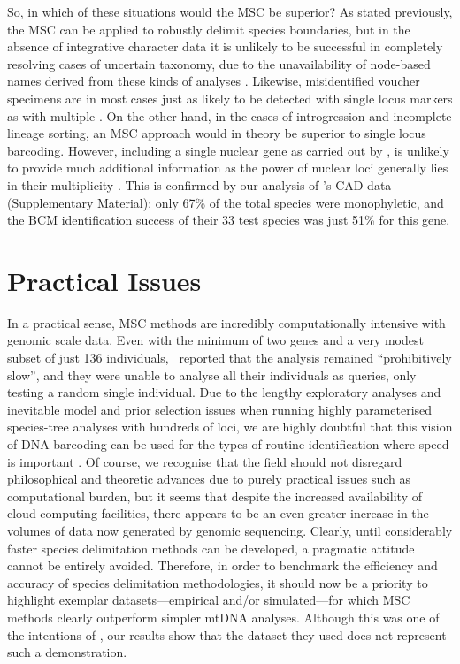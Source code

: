 \documentclass[12pt]{article}
\begin{document}
So, in which of these situations would the MSC be superior? As stated previously, the MSC can be applied to robustly delimit species boundaries, but in the absence of integrative character data it is unlikely to be successful in completely resolving cases of uncertain taxonomy, due to the unavailability of node-based names derived from these kinds of analyses \citep{Bauer2010}. Likewise, misidentified voucher specimens are in most cases just as likely to be detected with single locus markers as with multiple \citep{Becker2011,Ko2013}. On the other hand, in the cases of introgression and incomplete lineage sorting, an MSC approach would in theory be superior to single locus barcoding. However, including a single nuclear gene as carried out by \citeauthor{Dowton2014}, is unlikely to provide much additional information as the power of nuclear loci generally lies in their multiplicity \citep{Edwards2009}. This is confirmed by our analysis of \citeauthor{Dowton2014}'s CAD data (Supplementary Material); only 67\% of the total species were monophyletic, and the BCM identification success of their 33 test species was just 51\% for this gene. 


\section*{Practical Issues}

In a practical sense, MSC methods are incredibly computationally intensive with genomic scale data. Even with the minimum of two genes and a very modest subset of just 136 individuals, \citeauthor{Dowton2014}\ reported that the analysis remained ``prohibitively slow'', and they were unable to analyse all their individuals as queries, only testing a random single individual. Due to the lengthy exploratory analyses and inevitable model and prior selection issues when running highly parameterised species-tree analyses with hundreds of loci, we are highly doubtful that this vision of DNA barcoding can be used for the types of routine identification where speed is important \citep{Armstrong2005}. Of course, we recognise that the field should not disregard philosophical and theoretic advances due to purely practical issues such as computational burden, but it seems that despite the increased availability of cloud computing facilities, there appears to be an even greater increase in the volumes of data now generated by genomic sequencing. Clearly, until considerably faster species delimitation methods can be developed, a pragmatic attitude cannot be entirely avoided.  Therefore, in order to benchmark the efficiency and accuracy of species delimitation methodologies, it should now be a priority to highlight exemplar datasets---empirical and/or simulated---for which MSC methods clearly outperform simpler mtDNA analyses. Although this was one of the intentions of \citeauthor{Dowton2014}, our results show that the dataset they used does not represent such a demonstration. 
\end{document}
